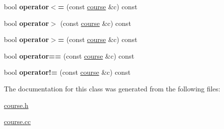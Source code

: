 \begin{DoxyCompactItemize}
\item 
\hypertarget{classcourse_a6416d3083ef57cca7ed77f260f48dc11}{}bool {\bfseries operator$<$=} (const \hyperlink{classcourse}{course} \&c) const \label{classcourse_a6416d3083ef57cca7ed77f260f48dc11}

\item 
\hypertarget{classcourse_a3d4e2681ba4f3ada21b2375129dbdae6}{}bool {\bfseries operator$>$} (const \hyperlink{classcourse}{course} \&c) const \label{classcourse_a3d4e2681ba4f3ada21b2375129dbdae6}

\item 
\hypertarget{classcourse_a3ca9c58c57cb82c195656648ee0dacab}{}bool {\bfseries operator$>$=} (const \hyperlink{classcourse}{course} \&c) const \label{classcourse_a3ca9c58c57cb82c195656648ee0dacab}

\item 
\hypertarget{classcourse_a9902543488788e4d53cd4614ed52ad25}{}bool {\bfseries operator==} (const \hyperlink{classcourse}{course} \&c) const \label{classcourse_a9902543488788e4d53cd4614ed52ad25}

\item 
\hypertarget{classcourse_a7e598f9d46bd8ac668c2f3429f065446}{}bool {\bfseries operator!=} (const \hyperlink{classcourse}{course} \&c) const \label{classcourse_a7e598f9d46bd8ac668c2f3429f065446}

\end{DoxyCompactItemize}


The documentation for this class was generated from the following files\+:\begin{DoxyCompactItemize}
\item 
\hyperlink{course_8h}{course.\+h}\item 
\hyperlink{course_8cc}{course.\+cc}\end{DoxyCompactItemize}
